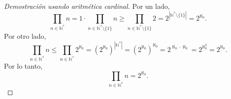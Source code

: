 \documentclass[a4,10pt]{aleph-notas}
\begin{document}
\begin{proof}[Demostración usando aritmética cardinal]
    Por un lado,
    \[
        \prod_{n\in\mathbb{N}^*} n 
        = 1\cdot\prod_{n\in\mathbb{N}^*\setminus \{1\}} n 
        \geq \prod_{n\in\mathbb{N}^*\setminus \{1\}} 2 
        = 2^{|\mathbb{N}^*\setminus \{1\}|}
        = 2^{\aleph_0}.
    \]
    Por otro lado,
    \[
        \prod_{n\in\mathbb{N}^*} n 
        \leq \prod_{n\in\mathbb{N}^*} 2^{\aleph_0 }
        = \left(2^{\aleph_0} \right)^{|\mathbb{N}^*|} 
        = \left(2^{\aleph_0} \right)^{\aleph_0} 
        = 2^{\aleph_0\cdot \aleph_0}
        = 2^{\aleph_0^2}
        = 2^{\aleph_0}.
    \]
    Por lo tanto,
    \[
        \prod_{n\in\mathbb{N}^*} n = 2^{\aleph_0}.
    \]
\end{proof}
\end{document}
